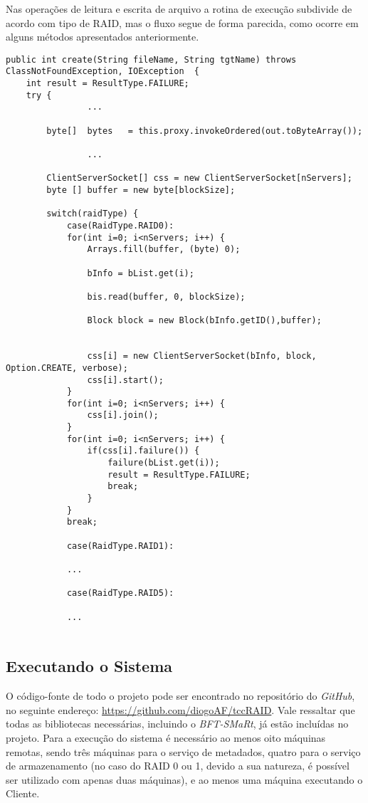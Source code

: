 Nas operações de leitura e escrita de arquivo a rotina de execução subdivide de acordo com tipo de RAID, mas o fluxo segue de forma parecida, como ocorre em alguns métodos apresentados anteriormente.
\begin{lstlisting}[basicstyle=\ttfamily\footnotesize, frame=single]	
public int create(String fileName, String tgtName) throws ClassNotFoundException, IOException  {
	int result = ResultType.FAILURE;
	try {
				...
		
		byte[]  bytes   = this.proxy.invokeOrdered(out.toByteArray());
		
				...
				
		ClientServerSocket[] css = new ClientServerSocket[nServers];
		byte [] buffer = new byte[blockSize];
		
		switch(raidType) {
			case(RaidType.RAID0):
			for(int i=0; i<nServers; i++) {
				Arrays.fill(buffer, (byte) 0);
				
				bInfo = bList.get(i);
				
				bis.read(buffer, 0, blockSize);
				
				Block block = new Block(bInfo.getID(),buffer);
				
				
				css[i] = new ClientServerSocket(bInfo, block, Option.CREATE, verbose);
				css[i].start();   
			}
			for(int i=0; i<nServers; i++) {
				css[i].join();
			}
			for(int i=0; i<nServers; i++) {
				if(css[i].failure()) {
					failure(bList.get(i));
					result = ResultType.FAILURE;
					break;
				}
			}
			break;
			
			case(RaidType.RAID1):
					
			...
			
			case(RaidType.RAID5):
			
			...
			
\end{lstlisting}


\subsection{Executando o Sistema}
O código-fonte de todo o projeto pode ser encontrado no repositório do \textit{GitHub}, no seguinte endereço:  \href{https://github.com/diogoAF/tccRAID}{https://github.com/diogoAF/tccRAID}. Vale ressaltar que todas as bibliotecas necessárias, incluindo o  \textit{BFT-SMaRt}, já estão incluídas no projeto. Para a execução do sistema é necessário ao menos oito máquinas remotas, sendo três máquinas para o serviço de metadados, quatro para o serviço de armazenamento (no caso do RAID 0 ou 1, devido a sua natureza, é possível ser utilizado com apenas duas máquinas), e ao menos uma máquina executando o Cliente.
\\

